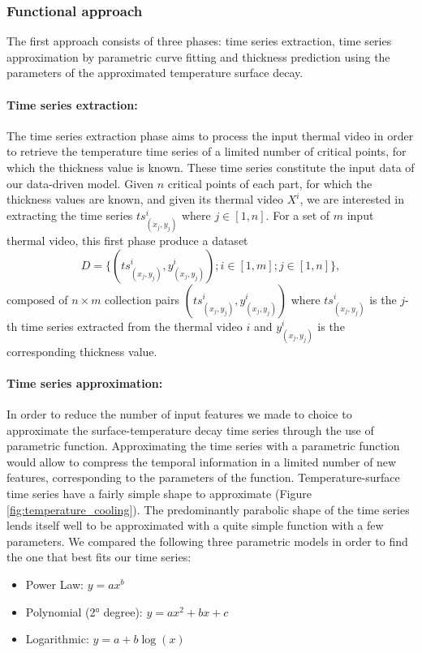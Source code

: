 \subsubsection{Functional approach} \label{Functional approach}

The first approach consists of three phases: time series extraction, time series approximation by parametric curve fitting and thickness prediction using the parameters of the approximated temperature surface decay.

\paragraph{Time series extraction:} 

The time series extraction phase aims to process the input thermal video in order to retrieve the temperature time series of a limited number of critical points, for which the thickness value is known. These time series constitute the input data of our data-driven model.
Given $n$ critical points of each part, for which the thickness values are known, and given its thermal video $X^i$, we are interested in extracting the time series $ts^{i}_{(x_j, y_j)}$ where $j \in [1,n]$. For a set of $m$ input thermal video, this first phase produce a dataset
\begin{equation}
    D = \{(ts^{i}_{(x_j, y_j)}, y^{i}_{(x_j, y_j)});i \in [1, m]; j \in [1, n]\},
\end{equation}
composed of $n\times m$ collection pairs $(ts^{i}_{(x_j, y_j)}, y^{i}_{(x_j, y_j)})$ where $ts^{i}_{(x_j, y_j)}$ is the $j$-th time series extracted from the thermal video $i$ and $y^{i}_{(x_j, y_j)}$ is the corresponding thickness value. 

\paragraph{Time series approximation:}

In order to reduce the number of input features we made to choice to approximate the surface-temperature decay time series through the use of parametric function. Approximating the time series with a parametric function would allow to compress the temporal information in a limited number of new features, corresponding to the parameters of the function. Temperature-surface time series have a fairly simple shape to approximate (Figure \ref{fig:temperature_cooling}). The predominantly parabolic shape of the time series lends itself well to be approximated with a quite simple function with a few parameters. We compared the following three parametric models in order to find the one that best fits our time series:
\begin{itemize}
    \item Power Law: $y=ax^b$
    \item Polynomial (2° degree): $y=ax^2+bx+c$
    \item Logarithmic: $y=a+b\log(x)$
\end{itemize}

